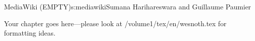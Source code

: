 \begin{aosachapter}{MediaWiki (EMPTY)}{s:mediawiki}{Sumana Harihareswara and Guillaume Paumier}

Your chapter goes here---please look at /volume1/tex/en/wesnoth.tex for 
formatting ideas.

\end{aosachapter}
